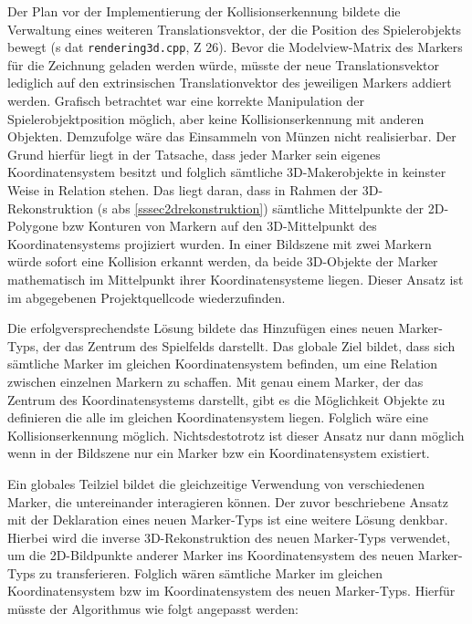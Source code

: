 Der Plan vor der Implementierung der Kollisionserkennung bildete die Verwaltung eines weiteren Translationsvektor, der die Position des Spielerobjekts bewegt (\acs{s} \acs{dat} \texttt{rendering3d.cpp}, \acs{Z} 26). Bevor die Modelview-Matrix des Markers für die Zeichnung geladen werden würde, müsste der neue Translationsvektor lediglich auf den extrinsischen Translationvektor des jeweiligen Markers addiert werden. Grafisch betrachtet war eine korrekte Manipulation der Spielerobjektposition möglich, aber keine Kollisionserkennung mit anderen Objekten. Demzufolge wäre das Einsammeln von Münzen nicht realisierbar. Der Grund hierfür liegt in der Tatsache, dass jeder Marker sein eigenes Koordinatensystem besitzt und folglich sämtliche 3D-Makerobjekte in keinster Weise in Relation stehen. Das liegt daran, dass in Rahmen der 3D-Rekonstruktion (\acs{s} \acs{abs} \ref{sssec2drekonstruktion}) sämtliche Mittelpunkte der 2D-Polygone \acs{bzw} Konturen von Markern auf den 3D-Mittelpunkt des Koordinatensystems projiziert wurden. In einer Bildszene mit zwei Markern würde sofort eine Kollision erkannt werden, da beide 3D-Objekte der Marker mathematisch im Mittelpunkt ihrer Koordinatensysteme liegen. Dieser Ansatz ist im abgegebenen Projektquellcode wiederzufinden.

Die erfolgversprechendste Lösung bildete das Hinzufügen eines neuen Marker-Typs, der das Zentrum des Spielfelds darstellt. Das globale Ziel bildet, dass sich sämtliche Marker im gleichen Koordinatensystem befinden, um eine Relation zwischen einzelnen Markern zu schaffen. Mit genau einem Marker, der das Zentrum des Koordinatensystems darstellt, gibt es die Möglichkeit Objekte zu definieren die alle im gleichen Koordinatensystem liegen. Folglich wäre eine Kollisionserkennung möglich. Nichtsdestotrotz ist dieser Ansatz nur dann möglich wenn in der Bildszene nur ein Marker \acs{bzw} ein Koordinatensystem existiert.

Ein globales Teilziel bildet die gleichzeitige Verwendung von verschiedenen Marker, die untereinander interagieren können. Der zuvor beschriebene Ansatz mit der Deklaration eines neuen Marker-Typs ist eine weitere Lösung denkbar. Hierbei wird die inverse 3D-Rekonstruktion des neuen Marker-Typs verwendet, um die 2D-Bildpunkte anderer Marker ins Koordinatensystem des neuen Marker-Typs zu transferieren. Folglich wären sämtliche Marker im gleichen Koordinatensystem \acs{bzw} im Koordinatensystem des neuen Marker-Typs. Hierfür müsste der Algorithmus wie folgt angepasst werden:

